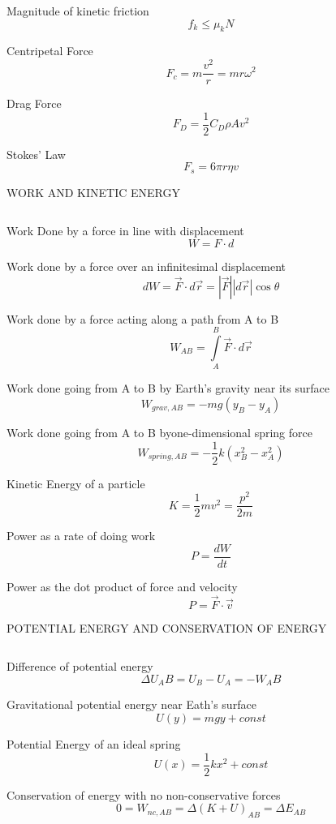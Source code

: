 \documentclass[12pt, letterpaper, twoside]{article}
\begin{document}
Magnitude of kinetic friction
$$f_k \leq \mu_k N$$


Centripetal Force
$$F_c = m \frac{v^2}{r} = mr\omega^2$$



Drag Force
$$F_D=\frac{1}{2} C_D \rho A v^2 $$


Stokes' Law
$$F_s = 6 \pi r \eta v $$








\newpage

WORK AND KINETIC ENERGY

$$ $$


Work Done by a force in line with displacement
$$ W = F \cdot d $$


Work done by a force over an infinitesimal displacement
$$ dW = \overrightarrow{F} \cdot d \overrightarrow{r} = | \overrightarrow{F} | | d \overrightarrow{r} | \cos \theta $$


Work done by a force acting along a path from A to B
$$ W_{AB} = \int\limits_A^B \overrightarrow{F} \cdot d \overrightarrow{r} $$


Work done going from A to B by Earth's gravity near its surface
$$ W_{grav,AB} = -mg(y_B - y_A) $$


Work done going from A to B byone-dimensional spring force
$$ W_{spring,AB} = - \frac{1}{2} k (x_B^2 - x_A^2) $$


Kinetic Energy of a particle
$$ K = \frac{1}{2} m v^2 = \frac{p^2}{2m} $$


Power as a rate of doing work
$$ P = \frac{dW}{dt} $$


Power as the dot product of force and velocity
$$ P = \overrightarrow{F} \cdot \overrightarrow{v} $$



\newpage

POTENTIAL ENERGY AND CONSERVATION OF ENERGY

$$ $$

Difference of potential energy
$$ \Delta U_AB = U_B - U_A = -W_AB $$


Gravitational potential energy near Eath's surface
$$ U(y) = mgy + const $$


Potential Energy of an ideal spring
$$  U(x) = \frac{1}{2} k x^2 + const $$


Conservation of energy with no non-conservative forces
$$ 0 = W_{nc,AB} = \Delta (K + U)_{AB} = \Delta E_{AB} $$
\end{document}
